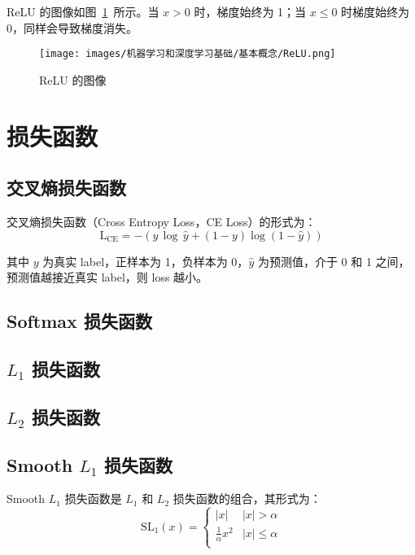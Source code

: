 ReLU 的图像如图~\ref{fig:ReLU}~所示。当 $x > 0$ 时，梯度始终为 1；当 $x \leq 0$
时梯度始终为 0，同样会导致梯度消失。

\begin{figure}[ht]
  \centering
  \texttt{[image: images/机器学习和深度学习基础/基本概念/ReLU.png]}
  \caption{ReLU 的图像}\label{fig:ReLU}
\end{figure}

\section{损失函数}

\subsection{交叉熵损失函数}\label{subsec:CELoss}

交叉熵损失函数（Cross Entropy Loss，CE Loss）的形式为：
\begin{equation}
  \label{equ:CELoss}
  \mathrm{L}_{\mathrm{CE}} = - \left( y \, \log \, \hat{y} + (1-y) \log (1-\hat{y}) \right )
\end{equation}

其中 $y$ 为真实 label，正样本为 1，负样本为 0，$\hat{y}$ 为预测值，介于 0 和 1
之间，预测值越接近真实 label，则 loss 越小。

\subsection{Softmax 损失函数}

\subsection{$L_1$ 损失函数}

\subsection{$L_2$ 损失函数}

\subsection{Smooth $L_1$ 损失函数}
Smooth $L_1$ 损失函数是 $L_1$ 和 $L_2$ 损失函数的组合，其形式为：
\begin{equation}
  \label{equ:SmoothL1}
  \mathrm{SL}_1(x) = \left\{
    \begin{array}{lr}
      |x| & |x| > \alpha \\
      \frac{1}{\alpha} x^2 & |x| \leq \alpha \\
    \end{array}
  \right.
\end{equation}

